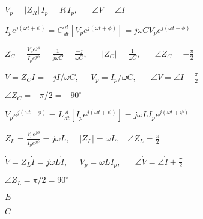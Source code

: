 \documentclass{article}
\def\lthtmlcheckvsize{\ifdim\ht\sizebox<\vsize 
  \ifdim\wd\sizebox<\hsize\expandafter\hfill\fi \expandafter\vfill
  \else\expandafter\vss\fi}%
\begin{document}
{\newpage\clearpage
{}%
$\displaystyle V_p=|Z_R|\,I_p=R\,I_p,\;\;\;\;\;\; \angle\dot{V}=\angle\dot{I}$%
\lthtmlindisplaymathZ
\lthtmlcheckvsize\clearpage}

{\newpage\clearpage
{}%
$\displaystyle I_pe^{j(\omega t+\psi)}=C\frac{d}{dt}[V_p e^{j(\omega t+\phi)}]
=j\omega C V_p e^{j(\omega t+\phi)}$%
\lthtmlindisplaymathZ
\lthtmlcheckvsize\clearpage}

{\newpage\clearpage
{}%
$\displaystyle Z_C=\frac{V_pe^{j\phi}}{I_pe^{j\psi}}=\frac{1}{j\omega C}=\frac{-j}{\omega C},
\;\;\;\;\;\;|Z_C|=\frac{1}{\omega C},\;\;\;\;\;\;\angle Z_C=-\frac{\pi}{2}$%
\lthtmlindisplaymathZ
\lthtmlcheckvsize\clearpage}

{\newpage\clearpage
{}%
$\displaystyle \dot{V}=Z_C\dot{I}=-j\dot{I}/\omega C,\;\;\;\;\;
V_p=I_p/\omega C,\;\;\;\;\;\; \angle\dot{V}=\angle\dot{I}-\frac{\pi}{2}$%
\lthtmlindisplaymathZ
\lthtmlcheckvsize\clearpage}

{\newpage\clearpage
{}%
$ \angle Z_C=-\pi/2=-90^\circ$%
\lthtmlindisplaymathZ
\lthtmlcheckvsize\clearpage}

{\newpage\clearpage
{}%
$\displaystyle V_pe^{j(\omega t+\phi)}=L\frac{d}{dt}[I_p e^{j(\omega t+\psi)}]
=j\omega L I_p e^{j(\omega t+\psi)}$%
\lthtmlindisplaymathZ
\lthtmlcheckvsize\clearpage}

{\newpage\clearpage
{}%
$\displaystyle Z_L =\frac{V_pe^{j\phi}}{I_pe^{j\psi}} =j\omega L,
\;\;\;\;|Z_L|=\omega L,\;\;\;\angle Z_L=\frac{\pi}{2}$%
\lthtmlindisplaymathZ
\lthtmlcheckvsize\clearpage}

{\newpage\clearpage
{}%
$\displaystyle \dot{V}=Z_L\dot{I}=j\omega L\dot{I},\;\;\;\;\;
V_p=\omega LI_p,\;\;\;\;\;\; \angle\dot{V}=\angle\dot{I}+\frac{\pi}{2}$%
\lthtmlindisplaymathZ
\lthtmlcheckvsize\clearpage}

{\newpage\clearpage
{}%
$ \angle Z_L=\pi/2=90^\circ$%
\lthtmlindisplaymathZ
\lthtmlcheckvsize\clearpage}

{\newpage\clearpage
{}%
$ E$%
\lthtmlindisplaymathZ
\lthtmlcheckvsize\clearpage}

{\newpage\clearpage
{}%
$ C$%
\lthtmlindisplaymathZ
\lthtmlcheckvsize\clearpage}
\end{document}
